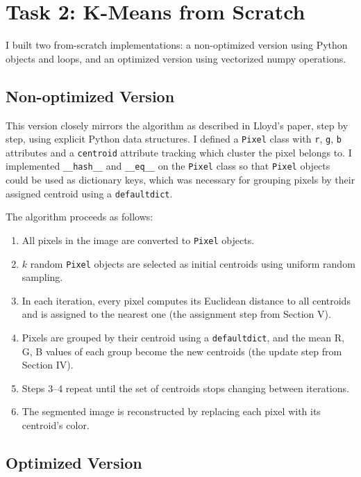 \documentclass[12pt]{article}
\begin{document}
\section{Task 2: K-Means from Scratch}

I built two from-scratch implementations: a non-optimized version using Python
objects and loops, and an optimized version using vectorized numpy operations.

\subsection{Non-optimized Version}

This version closely mirrors the algorithm as described in Lloyd's paper, step
by step, using explicit Python data structures. I defined a \texttt{Pixel}
class with \texttt{r}, \texttt{g}, \texttt{b} attributes and a
\texttt{centroid} attribute tracking which cluster the pixel belongs to. I
implemented \texttt{\_\_hash\_\_} and \texttt{\_\_eq\_\_} on the
\texttt{Pixel} class so that \texttt{Pixel} objects could be used as
dictionary keys, which was necessary for grouping pixels by their assigned
centroid using a \texttt{defaultdict}.

The algorithm proceeds as follows:
\begin{enumerate}
    \item All pixels in the image are converted to \texttt{Pixel} objects.
    \item $k$ random \texttt{Pixel} objects are selected as initial centroids
          using uniform random sampling.
    \item In each iteration, every pixel computes its Euclidean distance to all
          centroids and is assigned to the nearest one (the assignment step from
          Section V).
    \item Pixels are grouped by their centroid using a \texttt{defaultdict},
          and the mean R, G, B values of each group become the new centroids
          (the update step from Section IV).
    \item Steps 3--4 repeat until the set of centroids stops changing between
          iterations.
    \item The segmented image is reconstructed by replacing each pixel with its
          centroid's color.
\end{enumerate}

\subsection{Optimized Version}
\end{document}
